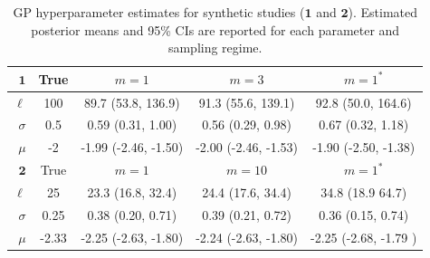 \documentclass{article}
\begin{document}
\begin{table}[ht!]
\caption{GP hyperparameter estimates for synthetic studies ($\mathbf{1}$ and $\mathbf{2}$). Estimated posterior means and 95\% CIs are reported for each parameter and sampling regime.} \centering
\begin{tabular}{ r | c | c c c } \toprule
$\mathbf{1}$ & True & $m=1$ &   $m=3$ &  $m=1^*$\\
\midrule
$\ell$ & 100 & 89.7 (53.8, 136.9)  & 91.3 (55.6, 139.1) & 92.8 (50.0, 164.6)  \\
$\sigma$ & 0.5 & 0.59 (0.31, 1.00) & 0.56 (0.29, 0.98) & 0.67 (0.32, 1.18) \\
$\mu$ & -2 & -1.99 (-2.46,  -1.50) & -2.00 (-2.46, -1.53) & -1.90 (-2.50, -1.38) \\
\hline 
\hline
$\mathbf{2}$ & True & $m=1$ &   $m=10$ &  $m=1^*$\\
\midrule
$\ell$ & 25 & 23.3 (16.8, 32.4)  & 24.4 (17.6, 34.4) & 34.8 (18.9 64.7)  \\
$\sigma$ & 0.25 & 0.38 (0.20,  0.71) & 0.39 (0.21, 0.72) & 0.36 (0.15,  0.74) \\
$\mu$ & -2.33 & -2.25 (-2.63, -1.80) & -2.24 (-2.63, -1.80) & -2.25 (-2.68, -1.79 ) \\ \bottomrule
\end{tabular}
\label{t12}
\end{table}
\end{document}
